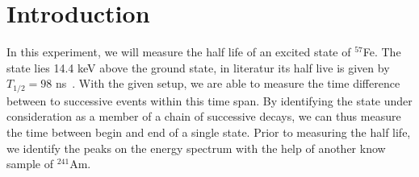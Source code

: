 \section{Introduction}
In this experiment, we will measure the half life of an excited state of 
$^{57}$Fe. The state lies 14.4 keV above the ground state, in literatur its half live is given 
by $T_{1/2} = 98$ ns~\cite{ver}. With the given setup, 
we are able to measure the time difference between to successive events within this 
time span. By identifying the state under consideration as a member of a chain of successive decays, 
we can thus measure the time between begin and end of a single state. 
Prior to measuring the half life, we identify the peaks on the energy spectrum 
with the help of another know sample of $^{241}$Am. 


